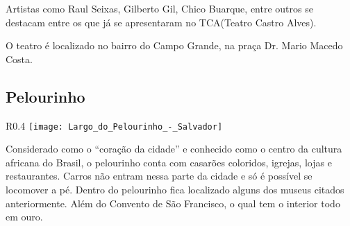 Artistas como Raul Seixas, Gilberto Gil, Chico Buarque, entre outros se destacam entre os que já se apresentaram no TCA(Teatro Castro Alves). 

O teatro é localizado no bairro do Campo Grande, na praça Dr. Mario Macedo Costa.

\subsection {Pelourinho}
                      \begin{wrapfigure}{R}{0.4\textwidth}
	                    \centering
                        \texttt{[image: Largo\_do\_Pelourinho\_-\_Salvador]}
                     \end{wrapfigure} 
                     
Considerado como o “coração da cidade” e conhecido como o centro da cultura africana do Brasil, o pelourinho conta com casarões coloridos, igrejas, lojas e restaurantes. Carros não entram nessa parte da cidade e só é possível se locomover a pé. Dentro do pelourinho fica localizado alguns dos museus citados anteriormente. Além do Convento de São Francisco, o qual tem o interior todo em ouro. 
                    
                     
               
 





     
     
     
     
     
     
     
     
     
     
     
     
     
     
     
     
     
     
     
     
     
     
     
     
     
     
     
     
     








